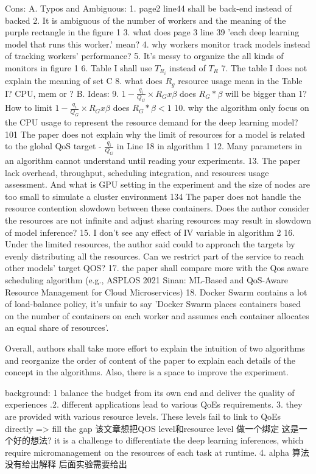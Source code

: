 \documentclass[8pt,UTF8]{article}
\begin{document}
                Cons: A. Typos and Ambiguous: 1. page2 line44 shall be back-end instead of backed 2. It is ambiguous of the number of workers and the meaning of the purple rectangle in the figure 1 3. what does page 3 line 39 'each deep learning model that runs this worker.' mean? 4. why workers monitor track models instead of tracking workers' performance? 5. It's messy to organize the all kinds of monitors in figure 1 6. Table I shall use $T_{R_i}$ instead of $T_R$ 7. The table I does not explain the meaning of set C 8. what does $R_g$ resource usage mean in the Table I? CPU, mem or ? B. Ideas: 9.  $1− \frac{q_i}{Q_G}×R_Gx\beta$ does $R_G*\beta$ will be bigger than 1? How to limit $1− \frac{q_i}{Q_G}×R_Gx\beta$ does $R_G*\beta < 1$  10. why the algorithm only focus on the CPU usage to represent the resource demand for the deep learning model? 101 The paper does not explain why the limit of resources for a model is related to the global QoS target - $\frac{q_i}{Q_G}$ in Line 18 in algorithm 1 12. Many parameters in an algorithm cannot understand until reading your experiments. 13. The paper lack overhead, throughput, scheduling integration, and resources usage assessment. And what is GPU setting in the experiment and the size of nodes are too small to simulate a cluster environment 134 The paper does not handle the resource contention slowdown between these containers. Does the author consider the resources are not infinite and adjust sharing resources may result in slowdown of model inference? 15. I don't see any effect of IV variable in algorithm 2 16. Under the limited resources, the author said could to approach the targets by evenly distributing all the resources. Can we restrict part of the service to reach other models' target QOS?  17. the paper shall compare more with the Qos aware scheduling algorithm (e.g., ASPLOS 2021 Sinan: ML-Based and QoS-Aware Resource Management for Cloud Microservices) 18. Docker Swarm contains a lot of load-balance policy,  it's unfair to say 'Docker Swarm places containers based on the number of containers on each worker and assumes each container allocates an equal share of resources'.  
                
                Overall, authors shall take more effort to explain the intuition of two algorithms and reorganize the order of content of the paper to explain each details of the concept in the algorithms. Also, there is a space to improve the experiment.
                
                background: 1 balance the budget from its own end and deliver the quality of experiences .2. different applications lead to various QoEs requirements. 3. they are provided with various resource levels. These levels fail to link to QoEs directly => fill the gap 该文章想把QOS level和resource level 做一个绑定 这是一个好的想法? it is a challenge to differentiate the deep learning inferences, which require micromanagement on the resources of each task at runtime. 4. alpha 算法没有给出解释 后面实验需要给出
                
\end{document}
